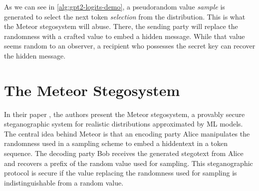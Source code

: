 As we can see in \autoref{alg:gpt2-logits-demo}, a pseudorandom value \emph{sample} is generated to select the next token \emph{selection} from the distribution.
This is what the Meteor stegosystem will abuse.
There, the sending party will replace the randomness with a crafted value to embed a hidden message.
While that value seems random to an observer, a recipient who possesses the secret key can recover the hidden message.

\newpage





\newpage

\section{The Meteor Stegosystem}
\label{sec:meteor}
In their paper \cite{Meteor2021}, the authors present the Meteor stegosystem, a provably secure steganographic system for realistic distributions approximated by ML models.
The central idea behind Meteor is that an encoding party Alice manipulates the randomness used in a sampling scheme to embed a hiddentext in a token sequence.
The decoding party Bob receives the generated stegotext from Alice and recovers a prefix of the random value used for sampling.
This steganographic protocol is secure if the value replacing the randomness used for sampling is indistinguishable from a random value.

